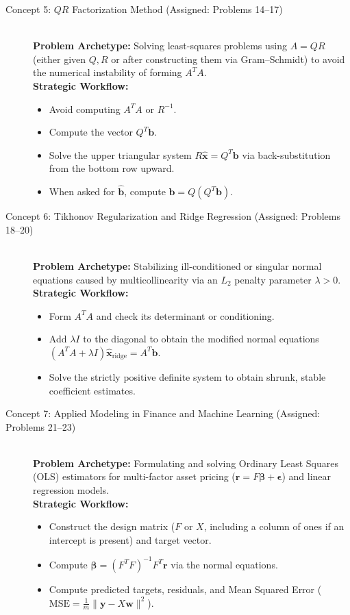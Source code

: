\documentclass[11pt, letterpaper]{article}
\theoremstyle{definition}
\theoremstyle{remark}
\begin{document}
\begin{description}
    \item[Concept 5: $QR$ Factorization Method (Assigned: Problems 14--17)] \hfill \\
    \textbf{Problem Archetype:} Solving least-squares problems using $A = QR$ (either given $Q, R$ or after constructing them via Gram--Schmidt) to avoid the numerical instability of forming $A^T A$.\\
    \textbf{Strategic Workflow:}
    \begin{itemize}
        \item Avoid computing $A^T A$ or $R^{-1}$.
        \item Compute the vector $Q^T \mathbf{b}$.
        \item Solve the upper triangular system $R\hat{\mathbf{x}} = Q^T \mathbf{b}$ via back-substitution from the bottom row upward.
        \item When asked for $\hat{\mathbf{b}}$, compute $\hat{\mathbf{b}} = Q(Q^T \mathbf{b})$.
    \end{itemize}

    \item[Concept 6: Tikhonov Regularization and Ridge Regression (Assigned: Problems 18--20)] \hfill \\
    \textbf{Problem Archetype:} Stabilizing ill-conditioned or singular normal equations caused by multicollinearity via an $L_2$ penalty parameter $\lambda > 0$.\\
    \textbf{Strategic Workflow:}
    \begin{itemize}
        \item Form $A^T A$ and check its determinant or conditioning.
        \item Add $\lambda I$ to the diagonal to obtain the modified normal equations $(A^T A + \lambda I)\hat{\mathbf{x}}_{\text{ridge}} = A^T \mathbf{b}$.
        \item Solve the strictly positive definite system to obtain shrunk, stable coefficient estimates.
    \end{itemize}

    \item[Concept 7: Applied Modeling in Finance and Machine Learning (Assigned: Problems 21--23)] \hfill \\
    \textbf{Problem Archetype:} Formulating and solving Ordinary Least Squares (OLS) estimators for multi-factor asset pricing ($\mathbf{r} = F\boldsymbol{\beta} + \boldsymbol{\epsilon}$) and linear regression models.\\
    \textbf{Strategic Workflow:}
    \begin{itemize}
        \item Construct the design matrix ($F$ or $X$, including a column of ones if an intercept is present) and target vector.
        \item Compute $\hat{\boldsymbol{\beta}} = (F^T F)^{-1} F^T \mathbf{r}$ via the normal equations.
        \item Compute predicted targets, residuals, and Mean Squared Error ($\text{MSE} = \frac{1}{m}\|\mathbf{y} - X\hat{\mathbf{w}}\|^2$).
    \end{itemize}


\end{description}
\end{document}

